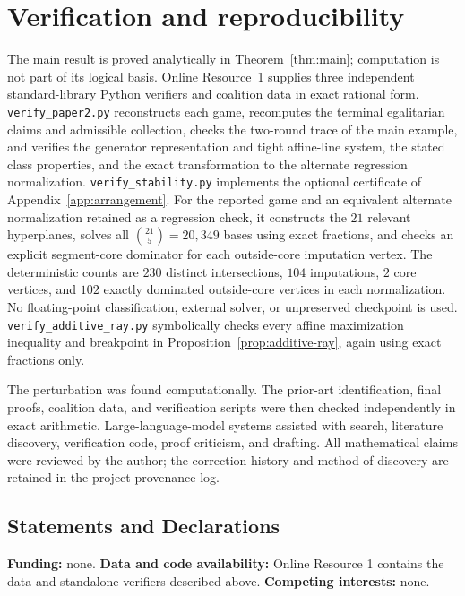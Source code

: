 \documentclass[11pt]{article}
\begin{document}


\section{Verification and reproducibility}\label{sec:methods}

The main result is proved analytically in
Theorem~\ref{thm:main}; computation is not part of its logical basis. Online
Resource~1 supplies three independent standard-library Python verifiers and
coalition data in exact rational form.
\texttt{verify\_paper2.py} reconstructs each game, recomputes the terminal
egalitarian claims and admissible collection, checks the two-round trace of
the main example, and verifies the generator representation and tight
affine-line system, the stated class properties, and the exact transformation
to the alternate regression normalization.
\texttt{verify\_stability.py} implements the optional certificate of
Appendix~\ref{app:arrangement}. For the reported game and an equivalent
alternate normalization retained as a regression check, it constructs the
$21$ relevant hyperplanes, solves all
$\binom{21}{5}=20{,}349$ bases using exact fractions, and checks an explicit
segment-core dominator for each outside-core imputation vertex. The
deterministic counts are $230$ distinct intersections, $104$ imputations,
$2$ core vertices, and $102$ exactly dominated outside-core vertices in
each normalization. No floating-point classification, external solver, or
unpreserved checkpoint is used.
\texttt{verify\_additive\_ray.py} symbolically checks every affine
maximization inequality and breakpoint in Proposition~\ref{prop:additive-ray},
again using exact fractions only.

The perturbation was found computationally. The prior-art identification,
final proofs, coalition data, and verification scripts were then checked
independently in exact arithmetic. Large-language-model systems assisted
with search, literature discovery, verification code, proof criticism, and
drafting. All mathematical claims were reviewed by the author; the correction
history and method of discovery are retained in the project provenance log.

\subsection*{Statements and Declarations}
\small
\textbf{Funding:} none.
\textbf{Data and code availability:} Online Resource 1 contains the data and
standalone verifiers described above.
\textbf{Competing interests:} none.
\normalsize
\end{document}
